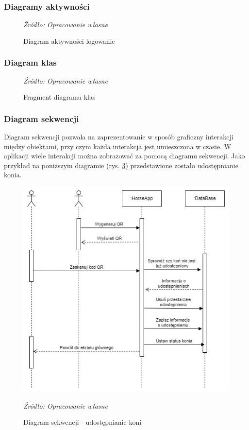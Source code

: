 \documentclass[12pt,oneside]{report}
\begin{document}
\subsubsection{Diagramy aktywności}
\begin{figure}[H]
	\centering
	\caption{Diagram aktywności logowanie}
	\textit{Źródło: Opracowanie własne}
	\label{DiagramAktywnościLogowanie}
\end{figure}
\subsubsection{Diagram klas}
\begin{figure}[H]
	\centering
	\caption{Fragment diagramu klas}
	\textit{Źródło: Opracowanie własne}
	\label{DiagramKlas}
\end{figure}
\subsubsection{Diagram sekwencji}
Diagram sekwencji pozwala na zaprezentowanie w sposób graficzny interakcji między obiektami, przy czym każda interakcja jest umieszczona w czasie. W aplikacji wiele interakcji można zobrazować za pomocą diagramu sekwencji. Jako przykład na poniższym diagramie (rys. \ref{DiagramSekwencjiUdostępnianie}) przedstawione zostało udostępnianie konia. 
\begin{figure}[H]
	\centering
	\includegraphics[scale=0.8]{DiagramSekwencjiUdostępnianie}
	\caption{Diagram sekwencji - udostępnianie koni}
	\textit{Źródło: Opracowanie własne}
	\label{DiagramSekwencjiUdostępnianie}
\end{figure}
\end{document}
